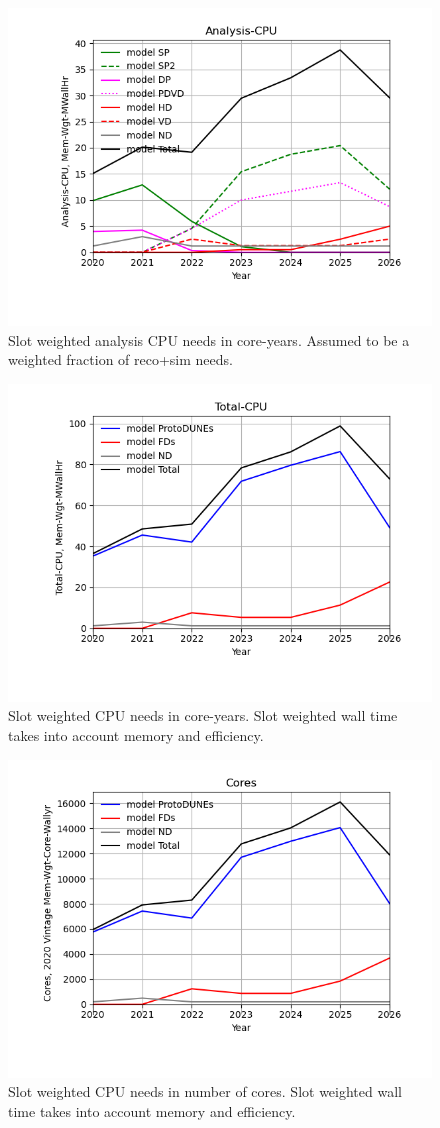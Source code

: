 \begin{figure}[h]
\centering\includegraphics[height=0.4\textwidth]{MoreSim_2022-11-21-2026/MoreSim_2022-11-21-2026-Analysis-CPU.png}
\caption{Slot weighted analysis CPU needs in core-years. Assumed to be a weighted fraction of reco+sim needs.}
\label{fig:Analysis-CPU}
\end{figure}
\begin{figure}[h]
\centering\includegraphics[height=0.4\textwidth]{MoreSim_2022-11-21-2026/MoreSim_2022-11-21-2026-Total-CPU.png}
\caption{Slot weighted CPU needs in core-years. Slot weighted wall time takes into account memory and efficiency.}
\label{fig:Total-CPU}
\end{figure}
\begin{figure}[h]
\centering\includegraphics[height=0.4\textwidth]{MoreSim_2022-11-21-2026/MoreSim_2022-11-21-2026-Cores.png}
\caption{Slot weighted CPU needs in number of cores. Slot weighted wall time takes into account memory and efficiency.}
\label{fig:Cores}
\end{figure}

